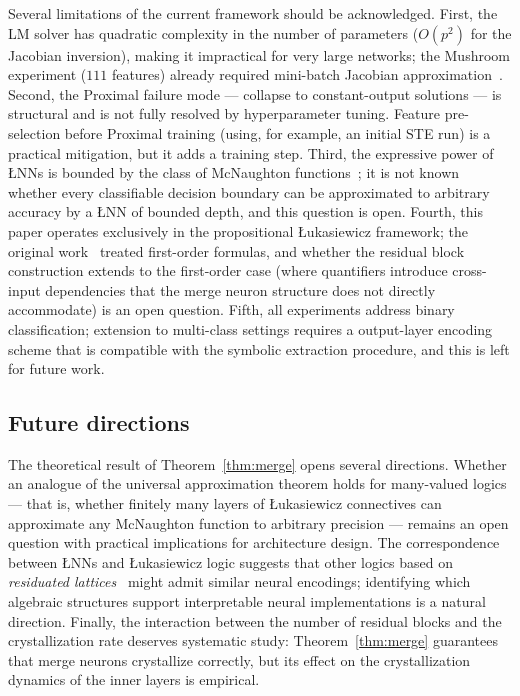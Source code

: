 \documentclass[10pt,a4paper,twoside]{article}
\newcommand{\LNN}{\L{}NN}
\begin{document}
Several limitations of the current framework should be acknowledged.
First, the LM solver has quadratic complexity in the number of parameters
($O(p^2)$ for the Jacobian inversion), making it impractical for very large
networks; the Mushroom experiment ($111$ features) already required mini-batch
Jacobian approximation~\cite{battiti1992}.
Second, the Proximal failure mode --- collapse to constant-output solutions ---
is structural and is not fully resolved by hyperparameter tuning.
Feature pre-selection before Proximal training (using, for example, an initial
STE run) is a practical mitigation, but it adds a training step.
Third, the expressive power of \LNN{}s is bounded by the class of McNaughton
functions~\cite{mcnaughton1951,hajek1998}; it is not known whether every
classifiable decision boundary can be approximated to arbitrary accuracy by a
\LNN{} of bounded depth, and this question is open.
Fourth, this paper operates exclusively in the propositional \L{}ukasiewicz
framework; the original work~\cite{leandro2009} treated first-order formulas,
and whether the residual block construction extends to the first-order case
(where quantifiers introduce cross-input dependencies that the merge neuron
structure does not directly accommodate) is an open question.
Fifth, all experiments address binary classification; extension to multi-class
settings requires a output-layer encoding scheme that is compatible with
the symbolic extraction procedure, and this is left for future work.

\subsection{Future directions}

The theoretical result of Theorem~\ref{thm:merge} opens several directions.
Whether an analogue of the universal approximation theorem holds for
many-valued logics --- that is, whether finitely many layers of \L{}ukasiewicz
connectives can approximate any McNaughton function to arbitrary
precision --- remains an open question with practical implications for
architecture design.
The correspondence between \LNN{}s and \L{}ukasiewicz logic suggests that
other logics based on \emph{residuated lattices}~\cite{hajek1998} might admit
similar neural encodings; identifying which algebraic structures support
interpretable neural implementations is a natural direction.
Finally, the interaction between the number of residual blocks and the
crystallization rate deserves systematic study: Theorem~\ref{thm:merge}
guarantees that merge neurons crystallize correctly, but its effect on the
crystallization dynamics of the inner layers is empirical.
\end{document}
